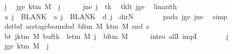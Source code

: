 \begin{isabellebody}
\ j\ \isamarkupfalse%
\ jge{\isacharcolon}{\kern0pt}\ {\isachardoublequoteopen}k{\isacharunderscore}{\kern0pt}tm\ M\ {\isasymle}\ j{\isachardoublequoteclose}\isanewline
\ \ \ \ \isamarkupfalse%
\ jne{\isacharcolon}{\kern0pt}\ {\isachardoublequoteopen}j\ {\isasymnoteq}\ tk{\isachardoublequoteclose}\ \isamarkupfalse%
\ tk{\isacharunderscore}{\kern0pt}lt\ jge\ \isamarkupfalse%
\ linarith\isanewline
\ \ \ \ \isamarkupfalse%
\ {\isachardoublequoteopen}{\isacharquery}{\kern0pt}a\ j\ {\isacharequal}{\kern0pt}\ BLANK{}\ {\isasymand}\ {\isacharquery}{\kern0pt}a\ j\ {\isacharequal}{\kern0pt}\ BLANK{}\ {\isasymand}\ {\isacharquery}{\kern0pt}d\ j\ {\isacharequal}{\kern0pt}\ dir{\isachardot}{\kern0pt}N{\isachardoublequoteclose}\isanewline
\ \ \ \ \ \ \isamarkupfalse%
\ pad{\isacharunderscore}{\kern0pt}a\ jge\ jne\ \isamarkupfalse%
\ simp\isanewline
\ \ \isamarkupfalse%
\isanewline
\ \ \isamarkupfalse%
\ dst{\isacharunderscore}{\kern0pt}bd{\isacharcolon}{\kern0pt}\ {\isachardoublequoteopen}ar{\isacharunderscore}{\kern0pt}stage{\isacharunderscore}{\kern0pt}bounded\ {\isacharparenleft}{\kern0pt}bl{\isacharunderscore}{\kern0pt}tm\ M{\isacharparenright}{\kern0pt}\ {\isacharparenleft}{\kern0pt}k{\isacharunderscore}{\kern0pt}tm\ M{\isacharparenright}{\kern0pt}\ {\isacharparenleft}{\kern0pt}snd\ {\isacharquery}{\kern0pt}s{\isacharprime}{\kern0pt}{\isacharparenright}{\kern0pt}{\isachardoublequoteclose}\isanewline
\ \ \isamarkupfalse%
\ {\isacharminus}{\kern0pt}\isanewline
\ \ \ \ \isamarkupfalse%
\ bt{\isacharcolon}{\kern0pt}\ {\isachardoublequoteopen}{\isasymforall}j{\isasymge}k{\isacharunderscore}{\kern0pt}tm\ M{\isachardot}{\kern0pt}\ {\isacharparenleft}{\kern0pt}buf{\isacharparenleft}{\kern0pt}tk\ {\isacharcolon}{\kern0pt}{\isacharequal}{\kern0pt}\ le{\isacharunderscore}{\kern0pt}tm\ M{\isacharparenright}{\kern0pt}{\isacharparenright}{\kern0pt}\ j\ {\isacharequal}{\kern0pt}\ bl{\isacharunderscore}{\kern0pt}tm\ M{\isachardoublequoteclose}\isanewline
\ \ \ \ \isamarkupfalse%
\ {\isacharparenleft}{\kern0pt}intro\ allI\ impI{\isacharparenright}{\kern0pt}\isanewline
\ \ \ \ \ \ \isamarkupfalse%
\ j\ \isamarkupfalse%
\ jge{\isacharcolon}{\kern0pt}\ {\isachardoublequoteopen}k{\isacharunderscore}{\kern0pt}tm\ M\ {\isasymle}\ j{\isachardoublequoteclose}\isanewline
\ \ \ \ \ \ \isamarkupfalse%

\end{isabellebody}
